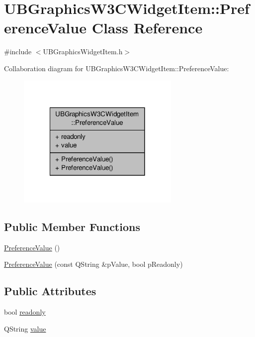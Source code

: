 \hypertarget{class_u_b_graphics_w3_c_widget_item_1_1_preference_value}{\section{U\-B\-Graphics\-W3\-C\-Widget\-Item\-:\-:Preference\-Value Class Reference}
\label{de/ddd/class_u_b_graphics_w3_c_widget_item_1_1_preference_value}
}


{\ttfamily \#include $<$U\-B\-Graphics\-Widget\-Item.\-h$>$}



Collaboration diagram for U\-B\-Graphics\-W3\-C\-Widget\-Item\-:\-:Preference\-Value\-:
\nopagebreak
\begin{figure}[H]
\begin{center}
\leavevmode
\includegraphics[width=222pt]{d9/d0b/class_u_b_graphics_w3_c_widget_item_1_1_preference_value__coll__graph}
\end{center}
\end{figure}
\subsection*{Public Member Functions}
\begin{DoxyCompactItemize}
\item 
\hyperlink{class_u_b_graphics_w3_c_widget_item_1_1_preference_value_ad1322b2c864d58cbf1aa46c61ec13399}{Preference\-Value} ()
\item 
\hyperlink{class_u_b_graphics_w3_c_widget_item_1_1_preference_value_a6890c843ddb3942d96e9711eecde31b5}{Preference\-Value} (const Q\-String \&p\-Value, bool p\-Readonly)
\end{DoxyCompactItemize}
\subsection*{Public Attributes}
\begin{DoxyCompactItemize}
\item 
bool \hyperlink{class_u_b_graphics_w3_c_widget_item_1_1_preference_value_a98a4b9dd07dc4c7698ac673a2aeb8a3a}{readonly}
\item 
Q\-String \hyperlink{class_u_b_graphics_w3_c_widget_item_1_1_preference_value_ab87f9f4e2ad782d6f0db8a7e4cff42ab}{value}
\end{DoxyCompactItemize}


